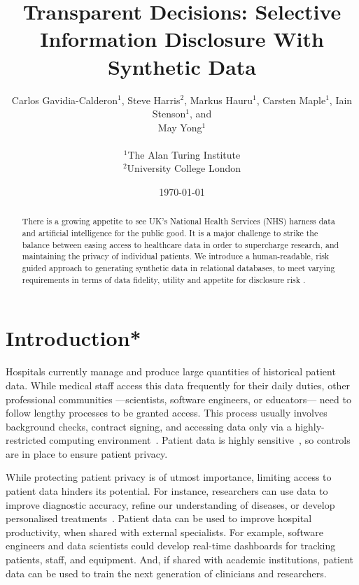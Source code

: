 \documentclass[11pt]{article}
\begin{document}
\title{Transparent Decisions: Selective Information Disclosure With Synthetic Data}
\author{
Carlos Gavidia-Calderon$^1$, Steve Harris$^2$, Markus Hauru$^1$, Carsten Maple$^1$, Iain Stenson$^1$, and \\ May Yong$^1$ \\~\\
$^1$The Alan Turing Institute \\
$^2$University College London
}
\date{\today} %
\maketitle
\begin{abstract}
There is a growing appetite to see UK's National Health Services (NHS) harness data and artificial intelligence for the public good. It is a major challenge to strike the balance between easing access to healthcare data in order to supercharge research, and maintaining the privacy of individual patients. We introduce a human-readable, risk guided approach to generating synthetic data in  relational databases, to meet varying requirements in terms of data fidelity, utility and appetite for disclosure risk  .
\end{abstract}

\section{Introduction*}

Hospitals currently manage and produce large quantities of historical
patient data.
While medical staff access this data frequently for their daily duties,
other professional communities ---scientists, software engineers, or educators--- need to follow lengthy processes to be granted
access.
This process usually involves background checks, contract signing, and 
accessing data only via a highly-restricted computing environment~\cite{harris2022}.
Patient data is highly sensitive~\cite{schomerus2022}, so controls are in place to ensure patient privacy.

While protecting patient privacy is of utmost importance, limiting access to 
patient data hinders its potential.
For instance, researchers can use data to improve diagnostic accuracy, refine our understanding of diseases, or develop personalised
treatments~\cite{tucker2020}.
Patient data can be used to improve hospital productivity, when shared
with external specialists.
For example, software engineers and data scientists could develop real-time dashboards 
for tracking patients, staff, and equipment.
And, if shared with academic institutions, patient data can be used to train the next generation of clinicians and researchers.
\end{document}
